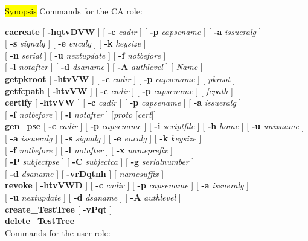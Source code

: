 \label{km}
\hl{Synopsis}
Commands for the CA role:

{\bf cacreate} [ {\bf -hqtvDVW} ] [ {\bf -c} {\em cadir} ] [ {\bf -p} {\em capsename} ] [ {\bf -a} {\em issueralg} ]
             \\ \hspace*{1.6cm} [ {\bf -s} {\em signalg} ] [ {\bf -e} {\em encalg} ] [ {\bf -k} {\em keysize} ]
             \\ \hspace*{1.6cm} [ {\bf -n} {\em serial} ] [ {\bf -u} {\em nextupdate} ] [ {\bf -f} {\em notbefore} ]
	     \\ \hspace*{1.6cm} [ {\bf -l} {\em notafter} ] [ {\bf -d} {\em dsaname} ] [ {\bf -A} {\em authlevel} ] [ {\em Name} ] \\
{\bf getpkroot} [ {\bf -htvVW} ] [ {\bf -c} {\em cadir} ] [ {\bf -p} {\em capsename} ] [ {\em pkroot} ] \\
{\bf getfcpath} [ {\bf -htvVW} ] [ {\bf -c} {\em cadir} ] [ {\bf -p} {\em capsename} ] [ {\em fcpath} ] \\
{\bf certify} [ {\bf -htvVW} ] [ {\bf -c} {\em cadir} ] [ {\bf -p} {\em capsename} ] [ {\bf -a} {\em issueralg} ] \\
\hspace*{1.6cm} [ {\bf -f} {\em notbefore} ] [ {\bf -l} {\em notafter} ] [{\em proto} [{\em cert}]] \\
{\bf gen\_pse} [ {\bf -c} {\em cadir} ] [ {\bf -p} {\em capsename} ] [ {\bf -i} {\em scriptfile} ] [ {\bf -h} {\em 
home} ] [ {\bf -u} {\em unixname} ] \\ 
\hspace*{1.6cm} [ {\bf -a} {\em issueralg} ] [ {\bf -s} {\em signalg} ] [ {\bf -e} {\em encalg} ] [ {\bf -k} {\em 
keysize} ] \\ 
\hspace*{1.6cm} [ {\bf -f} {\em notbefore} ] [ {\bf -l} {\em notafter} ] [ {\bf -x} {\em nameprefix} ]  \\ 
\hspace*{1.6cm} [ {\bf -P} {\em subjectpse} ] [ {\bf -C} {\em subjectca} ] [ {\bf -g} {\em serialnumber} ] \\
\hspace*{1.6cm} [ {\bf -d} {\em dsaname} ] [ {\bf -vrDqtnh} ] [ {\em namesuffix} ] \\
{\bf revoke} [ {\bf -htvVWD} ] [ {\bf -c} {\em cadir} ] [ {\bf -p} {\em capsename} ] [ {\bf -a} {\em issueralg} ] 
             \\ \hspace*{1.6cm} [ {\bf -u} {\em nextupdate} ] [ {\bf -d} {\em dsaname} ] [ {\bf -A} {\em authlevel} ] \\
{\bf create\_TestTree} [ {\bf -vPqt} ] \\
{\bf delete\_TestTree}
\\ [1em]
Commands for the user role:

